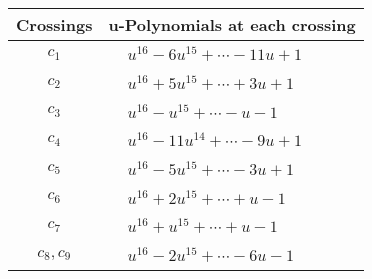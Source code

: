 \documentclass[1p]{elsarticle_modified}
\theoremstyle{definition}
\begin{document}
\begin{tabular}{m{50pt}|m{274pt}}
Crossings & \hspace{64pt}u-Polynomials at each crossing \\
\hline $$\begin{aligned}c_{1}\end{aligned}$$&$\begin{aligned}
&u^{16}-6 u^{15}+\cdots-11 u+1
\end{aligned}$\\
\hline $$\begin{aligned}c_{2}\end{aligned}$$&$\begin{aligned}
&u^{16}+5 u^{15}+\cdots+3 u+1
\end{aligned}$\\
\hline $$\begin{aligned}c_{3}\end{aligned}$$&$\begin{aligned}
&u^{16}- u^{15}+\cdots- u-1
\end{aligned}$\\
\hline $$\begin{aligned}c_{4}\end{aligned}$$&$\begin{aligned}
&u^{16}-11 u^{14}+\cdots-9 u+1
\end{aligned}$\\
\hline $$\begin{aligned}c_{5}\end{aligned}$$&$\begin{aligned}
&u^{16}-5 u^{15}+\cdots-3 u+1
\end{aligned}$\\
\hline $$\begin{aligned}c_{6}\end{aligned}$$&$\begin{aligned}
&u^{16}+2 u^{15}+\cdots+u-1
\end{aligned}$\\
\hline $$\begin{aligned}c_{7}\end{aligned}$$&$\begin{aligned}
&u^{16}+u^{15}+\cdots+u-1
\end{aligned}$\\
\hline $$\begin{aligned}c_{8},c_{9}\end{aligned}$$&$\begin{aligned}
&u^{16}-2 u^{15}+\cdots-6 u-1
\end{aligned}$\\

\end{tabular}
\end{document}
